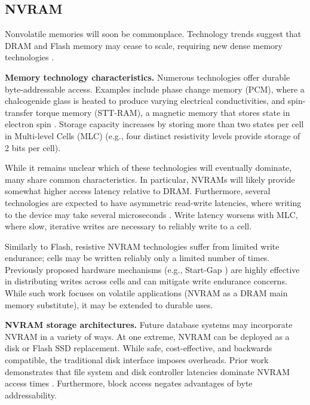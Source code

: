 \subsection{NVRAM}
\label{sec:Background:Storage:NVRAM}

Nonvolatile memories will soon be commonplace.
Technology trends suggest that DRAM and Flash memory may cease to scale, requiring new dense memory technologies \cite{LeeIpek09}.

\textbf{Memory technology characteristics.}
Numerous technologies offer durable byte-addressable access.
Examples include phase change memory (PCM), where a chalcogenide glass is heated to produce varying electrical conductivities, and spin-transfer torque memory (STT-RAM), a magnetic memory that stores state in electron spin \cite{BurrKurdi08}.
Storage capacity increases by storing more than two states per cell in Multi-level Cells (MLC) (e.g., four distinct resistivity levels provide storage of 2 bits per cell).

While it remains unclear which of these technologies will eventually dominate, many share common characteristics.
In particular, NVRAMs will likely provide somewhat higher access latency relative to DRAM.
Furthermore, several technologies are expected to have asymmetric read-write latencies, where writing to the device may take several microseconds \cite{QureshiSrinivasan09}.
Write latency worsens with MLC, where slow, iterative writes are necessary to reliably write to a cell.

Similarly to Flash, resistive NVRAM technologies suffer from limited write endurance; cells may be written reliably only a limited number of times.
Previously proposed hardware mechanisms (e.g., Start-Gap \cite{QureshiKaridis09}) are highly effective in distributing writes across cells and can mitigate write endurance concerns.
While such work focuses on volatile applications (NVRAM as a DRAM main memory substitute), it may be extended to durable uses.

\textbf{NVRAM storage architectures.}
Future database systems may incorporate NVRAM in a variety of ways.
At one extreme, NVRAM can be deployed as a disk or Flash SSD replacement.
While safe, cost-effective, and backwards compatible, the traditional disk interface imposes overheads.
Prior work demonstrates that file system and disk controller latencies dominate NVRAM access times \cite{CaulfieldDe10}.
Furthermore, block access negates advantages of byte addressability.

